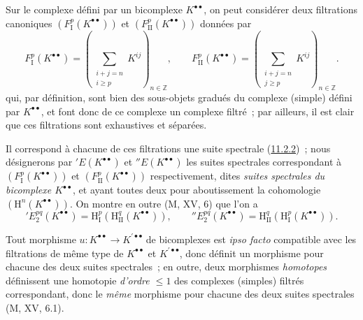 \begin{env}[11.3.2]
\label{0.11.3.2-fr}
Sur le complexe défini par un bicomplexe $K^{\bullet\bullet}$, on peut
considérer deux filtrations canoniques
$(F_{\mathrm I}^p(K^{\bullet\bullet}))$ et
$(F_{\mathrm{II}}^p(K^{\bullet\bullet}))$ données par
\[
\label{0.11.3.2.1-fr}
  F_{\mathrm I}^p(K^{\bullet\bullet})
  =\left(\sum_{\substack{i+j=n\\i\geq p}}K^{ij}\right)_{n\in\mathbb Z},
  \qquad
  F_{\mathrm{II}}^p(K^{\bullet\bullet})
  =\left(\sum_{\substack{i+j=n\\j\geq p}}K^{ij}\right)_{n\in\mathbb Z}.
  \tag{11.3.2.1}
\]
qui, par définition, sont bien des sous-objets gradués du complexe (simple)
défini par $K^{\bullet\bullet}$, et font donc de ce complexe un complexe
filtré~; par ailleurs, il est clair que ces filtrations sont exhaustives et
séparées.

Il correspond à chacune de ces filtrations une suite spectrale
(\hyperref[0.11.2.2-fr]{11.2.2})~; nous désignerons par
$'E(K^{\bullet\bullet})$ et $''E(K^{\bullet\bullet})$ les suites spectrales
correspondant à $(F_{\mathrm I}^p(K^{\bullet\bullet}))$ et
$(F_{\mathrm{II}}^p(K^{\bullet\bullet}))$ respectivement, dites
\emph{suites spectrales du bicomplexe $K^{\bullet\bullet}$}, et ayant toutes
deux pour aboutissement la cohomologie
$(\mathrm H^n(K^{\bullet\bullet}))$. On montre en outre (M, XV, 6) que l'on a
\[
\label{0.11.3.2.2-fr}
  'E_2^{pq}(K^{\bullet\bullet})
  =\mathrm H_{\mathrm I}^p(\mathrm H_{\mathrm{II}}^q(K^{\bullet\bullet})),
  \qquad
  ''E_2^{pq}(K^{\bullet\bullet})
  =\mathrm H_{\mathrm{II}}^q(\mathrm H_{\mathrm I}^p(K^{\bullet\bullet})).
  \tag{11.3.2.2}
\]

Tout morphisme $u:K^{\bullet\bullet}\to K^{\prime\bullet\bullet}$ de
bicomplexes est \emph{ipso facto} compatible avec les filtrations de même
type de $K^{\bullet\bullet}$ et $K^{\prime\bullet\bullet}$, donc définit un
morphisme pour chacune des deux suites spectrales~; en outre, deux morphismes
\emph{homotopes} définissent une homotopie \emph{d'ordre $\leq1$} des
complexes (simples) filtrés correspondant, donc le \emph{même} morphisme pour
chacune des deux suites spectrales (M, XV, 6.1).
\end{env}

